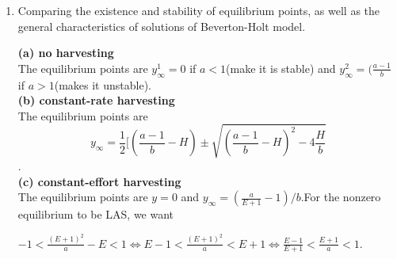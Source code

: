 \documentclass[12pt]{article}
\begin{document}
\begin{enumerate}
(c) In this part we derive the opposite conclusion to part(b) when the parameters do not give rise to LAS condition. 
For the first part we check what happens(behavior) using cobweb graph(Figure 1) when $a>\frac{(E+1)^2}{E-1}$.\\

For the second part we check what happens when\hspace{0.1cm} $a<E-1$\hspace{0.1cm}.It is obvious there is a contradiction because in part (a) above it was established that zero equilibrium is LAS when $E-1<a<E+1$.There is zero equilibrium which is unstable hence population move towards extinction.

\begin{figure} [ht!]
 \centering
 \texttt{[image: /Users/ERICAGYEMANG/Desktop/Biomath/Figures/tmp4.jpg]} 
\caption[Figure 2.4: r>1]{The cobweb diagram shows an oscillating movement around the equilibrium this means it is not approaching zero or extinction.}
 \label{fig::model}
\end{figure}

\cleardoublepage 

\item Comparing the existence and stability of equilibrium points, as well as the general characteristics of solutions of Beverton-Holt model.

\textbf {(a) no harvesting}\\
The equilibrium points are $y_\infty^1=0$ if $a<1$(make it is stable) and $y_\infty^2=(\frac{a-1}{b}$ if $a>1$(makes it unstable).\\

\textbf {(b) constant-rate harvesting}\\
The equilibrium points are \[y_\infty=\frac{1}{2}[(\frac{a-1}{b}-H)\pm \sqrt{(\frac{a-1}{b}-H)^2 -4\frac{H}{b}}\].\\

\textbf {(c) constant-effort harvesting}\\
The equilibrium points are $y=0$ and $y_\infty=(\frac{a}{E+1}-1)/b$.For the nonzero equilibrium to be LAS, we want

$-1<\frac{(E+1)^2}{a}-E<1\Leftrightarrow E-1<\frac{(E+1)^2}{a}<E+1\Leftrightarrow \boxed{\frac{E-1}{E+1}<\frac{E+1}{a}<1}.$\\


\end{enumerate}
\end{document}
